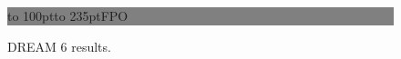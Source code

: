 \documentclass{bioinfo}
\begin{document}
\begin{methods}
%
%
%
%
%
%
%
%
%


\end{methods}

\begin{figure}[!tpb]%
\fboxsep=0pt\colorbox{gray}{\begin{minipage}[t]{235pt} \vbox to 100pt{\vfill\hbox to
235pt{\hfill\fontsize{24pt}{24pt}\selectfont FPO\hfill}\vfill}
\end{minipage}}
\caption{DREAM 6 results.}\label{fig:01}
\end{figure}

\end{document}
